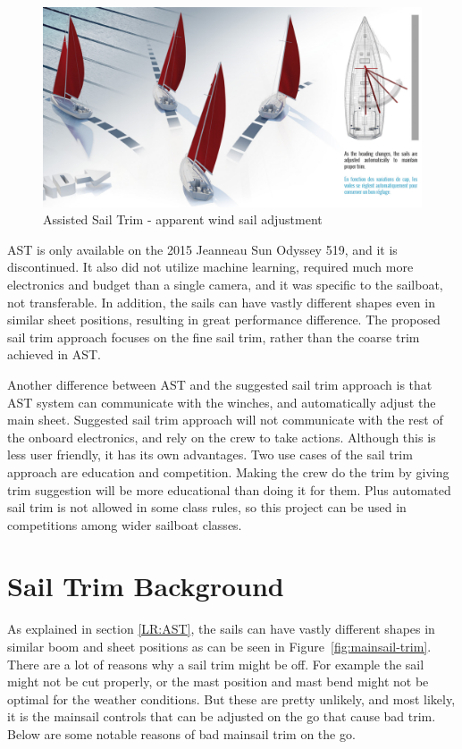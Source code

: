 \begin{figure}[h]
\centering
\includegraphics[width = \hsize]{figures/AST.png}
\caption{Assisted Sail Trim - apparent wind sail adjustment \cite{ASTbrochure}}
\label{fig:AST}
\end{figure}

AST is only available on the 2015 Jeanneau Sun Odyssey 519, and it is discontinued. It also did not utilize machine learning, required much more electronics and budget than a single camera, and it was specific to the sailboat, not transferable. In addition, the sails can have vastly different shapes even in similar sheet positions, resulting in great performance difference. The proposed sail trim approach focuses on the fine sail trim, rather than the coarse trim achieved in AST.

Another difference between AST and the suggested sail trim approach is that AST system can communicate with the winches, and automatically adjust the main sheet. Suggested sail trim approach will not communicate with the rest of the onboard electronics, and rely on the crew to take actions. Although this is less user friendly, it has its own advantages. Two use cases of the sail trim approach are education and competition. Making the crew do the trim by giving trim suggestion will be more educational than doing it for them. Plus automated sail trim is not allowed in some class rules, so this project can be used in competitions among wider sailboat classes.

\section{Sail Trim Background}
As explained in section \ref{LR:AST}, the sails can have vastly different shapes in similar boom and sheet positions as can be seen in Figure~\ref{fig:mainsail-trim}. There are a lot of reasons why a sail trim might be off. For example the sail might not be cut properly, or the mast position and mast bend might not be optimal for the weather conditions. But these are pretty unlikely, and most likely, it is the mainsail controls that can be adjusted on the go that cause bad trim. Below are some notable reasons of bad mainsail trim on the go.

